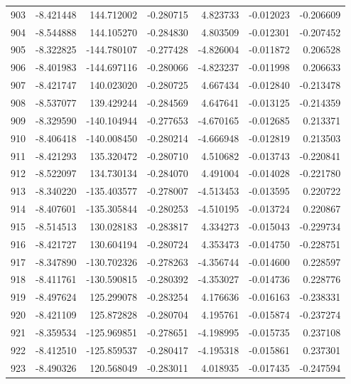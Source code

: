 \begin{tabular}{rrrrrrr}
 903 &  -8.421448 &  144.712002 & -0.280715 &   4.823733 &  -0.012023 & -0.206609 \\
 904 &  -8.544888 &  144.105270 & -0.284830 &   4.803509 &  -0.012301 & -0.207452 \\
 905 &  -8.322825 & -144.780107 & -0.277428 &  -4.826004 &  -0.011872 &  0.206528 \\
 906 &  -8.401983 & -144.697116 & -0.280066 &  -4.823237 &  -0.011998 &  0.206633 \\
 907 &  -8.421747 &  140.023020 & -0.280725 &   4.667434 &  -0.012840 & -0.213478 \\
 908 &  -8.537077 &  139.429244 & -0.284569 &   4.647641 &  -0.013125 & -0.214359 \\
 909 &  -8.329590 & -140.104944 & -0.277653 &  -4.670165 &  -0.012685 &  0.213371 \\
 910 &  -8.406418 & -140.008450 & -0.280214 &  -4.666948 &  -0.012819 &  0.213503 \\
 911 &  -8.421293 &  135.320472 & -0.280710 &   4.510682 &  -0.013743 & -0.220841 \\
 912 &  -8.522097 &  134.730134 & -0.284070 &   4.491004 &  -0.014028 & -0.221780 \\
 913 &  -8.340220 & -135.403577 & -0.278007 &  -4.513453 &  -0.013595 &  0.220722 \\
 914 &  -8.407601 & -135.305844 & -0.280253 &  -4.510195 &  -0.013724 &  0.220867 \\
 915 &  -8.514513 &  130.028183 & -0.283817 &   4.334273 &  -0.015043 & -0.229734 \\
 916 &  -8.421727 &  130.604194 & -0.280724 &   4.353473 &  -0.014750 & -0.228751 \\
 917 &  -8.347890 & -130.702326 & -0.278263 &  -4.356744 &  -0.014600 &  0.228597 \\
 918 &  -8.411761 & -130.590815 & -0.280392 &  -4.353027 &  -0.014736 &  0.228776 \\
 919 &  -8.497624 &  125.299078 & -0.283254 &   4.176636 &  -0.016163 & -0.238331 \\
 920 &  -8.421109 &  125.872828 & -0.280704 &   4.195761 &  -0.015874 & -0.237274 \\
 921 &  -8.359534 & -125.969851 & -0.278651 &  -4.198995 &  -0.015735 &  0.237108 \\
 922 &  -8.412510 & -125.859537 & -0.280417 &  -4.195318 &  -0.015861 &  0.237301 \\
 923 &  -8.490326 &  120.568049 & -0.283011 &   4.018935 &  -0.017435 & -0.247594 \\

\end{tabular}
